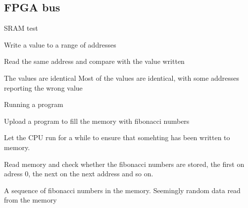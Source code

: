 \subsection{FPGA bus}
\test
{SRAM test}{
    \item{Write a value to a range of addresses}
    \item{Read the same address and compare with the value written}
}{The values are identical}
{Most of the values are identical, with some addresses reporting the wrong value}

\test
{Running a program}{
    \item{Upload a program to fill the memory with fibonacci numbers}
    \item{Let the CPU run for a while to ensure that somehting has been written to memory.}
    \item{Read memory and check whether the fibonacci numbers are stored, the first on adress 0, the next on the next address and so on.}
}{A sequence of fibonacci numbers in the memory.}
{Seemingly random data read from the memory}

